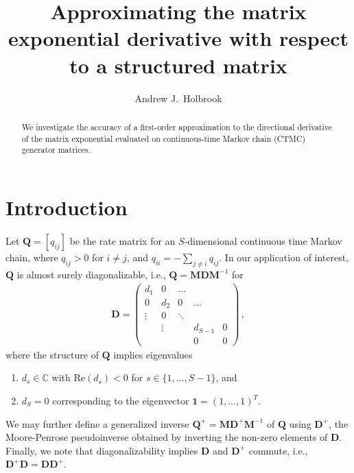 \documentclass[12pt]{article} %
\title{Approximating the matrix exponential derivative with respect to a structured matrix}
\author{Andrew J.~Holbrook}
\affil{UCLA Biostatistics}
\begin{document}
\maketitle




\begin{abstract}

We investigate the accuracy of a first-order approximation to the directional derivative of the matrix exponential evaluated on continuous-time Markov chain (CTMC) generator matrices.


\end{abstract}



\section{Introduction}\label{sec:intro}


\newcommand{\QQ}{\mathbf{Q}}
\newcommand{\DD}{\mathbf{D}}
\newcommand{\MM}{\mathbf{M}}
\newcommand{\JJ}{\mathbf{J}}
\newcommand{\II}{\mathbf{I}}
\newcommand{\RR}{\mathbf{R}}
\newcommand{\Zero}{\boldsymbol{0}}
\newcommand{\ttheta}{\boldsymbol{\theta}}
\newcommand{\Llambda}{\boldsymbol{\Lambda}}
\newcommand{\vecc}{\mbox{vec}}
\newcommand{\CC}{\mathbf{C}}
\newcommand{\BB}{\mathbf{B}}
\renewcommand{\AA}{\mathbf{A}}
\newcommand{\GG}{\mathbf{G}}

Let $\QQ=[q_{ij}]$ be the rate matrix for an $S$-dimensional continuous time Markov chain, where $q_{ij}>0$ for $i\neq j$, and $q_{ii} = -\sum_{j\neq i} q_{ij}$.  In our application of interest, $\QQ$ is almost surely diagonalizable, i.e., $\QQ=\MM \DD \MM^{-1}$ for 
\begin{align*}
	\DD = \begin{pmatrix}
		d_1& 0 &\dots & & \\
		0  & d_2 &0  & \dots& \\
		\vdots &0 & \ddots & \\
		& \vdots& & d_{S-1} &0 \\
		&&&0&0
	\end{pmatrix} \, ,
\end{align*}
where the structure of $\QQ$ implies eigenvalues
\begin{enumerate}
	\item $d_s\in \mathbb{C}$ with $\mbox{Re}(d_s)<0$ for $s\in\{1,\dots,S-1\}$, and
	\item $d_S =0$ corresponding to the eigenvector $\boldsymbol{1}=(1,\dots,1)^T$. 
\end{enumerate} 
We may further define a generalized inverse $\QQ^+=\MM \DD^{+} \MM^{-1}$ of $\QQ$ using $\DD^+$, the Moore-Penrose pseudoinverse obtained by inverting the non-zero elements of $\DD$.   Finally, we note that diagonalizability implies $\DD$ and $\DD^+$ commute, i.e., $\DD^+\DD=\DD\DD^+$.
\end{document}
